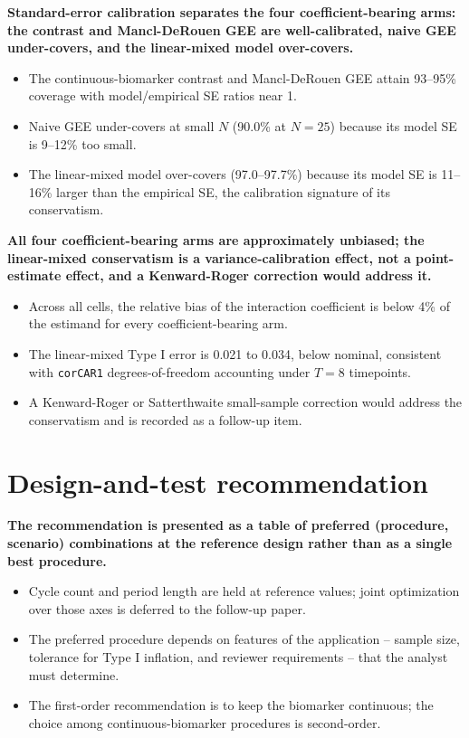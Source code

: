 \documentclass[
  11pt,
]{article}
\begin{document}
\textbf{Standard-error calibration separates the four coefficient-bearing arms: the contrast and Mancl-DeRouen GEE are well-calibrated, naive GEE under-covers, and the linear-mixed model over-covers.}

\begin{itemize}\setlength{\itemsep}{2pt}\setlength{\parskip}{0pt}
\item The continuous-biomarker contrast and Mancl-DeRouen GEE attain 93--95\% coverage with model/empirical SE ratios near 1.
\item Naive GEE under-covers at small $N$ (90.0\% at $N = 25$) because its model SE is 9--12\% too small.
\item The linear-mixed model over-covers (97.0--97.7\%) because its model SE is 11--16\% larger than the empirical SE, the calibration signature of its conservatism.
\end{itemize}

\textbf{All four coefficient-bearing arms are approximately unbiased; the linear-mixed conservatism is a variance-calibration effect, not a point-estimate effect, and a Kenward-Roger correction would address it.}

\begin{itemize}\setlength{\itemsep}{2pt}\setlength{\parskip}{0pt}
\item Across all cells, the relative bias of the interaction coefficient is below 4\% of the estimand for every coefficient-bearing arm.
\item The linear-mixed Type I error is 0.021 to 0.034, below nominal, consistent with \texttt{corCAR1} degrees-of-freedom accounting under $T = 8$ timepoints.
\item A Kenward-Roger or Satterthwaite small-sample correction would address the conservatism and is recorded as a follow-up item.
\end{itemize}

\section{Design-and-test recommendation}\label{design-and-test-recommendation}

\textbf{The recommendation is presented as a table of preferred (procedure, scenario) combinations at the reference design rather than as a single best procedure.}

\begin{itemize}\setlength{\itemsep}{2pt}\setlength{\parskip}{0pt}
\item Cycle count and period length are held at reference values; joint optimization over those axes is deferred to the follow-up paper.
\item The preferred procedure depends on features of the application -- sample size, tolerance for Type I inflation, and reviewer requirements -- that the analyst must determine.
\item The first-order recommendation is to keep the biomarker continuous; the choice among continuous-biomarker procedures is second-order.
\end{itemize}
\end{document}
